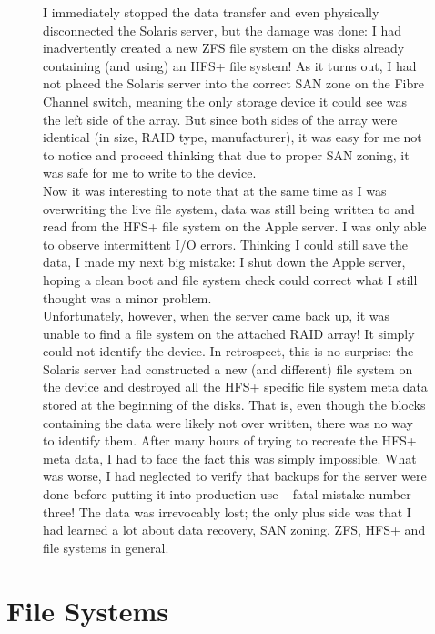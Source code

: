 \begin{figure}
\begin{experience}
\ContinuedFloat
I immediately stopped the data transfer and even
physically disconnected the Solaris server, but the
damage was done: I had inadvertently created a new ZFS
file system on the disks already containing (and
using) an HFS+ file system!  As it turns out, I had
not placed the Solaris server into the correct SAN
zone on the Fibre Channel switch, meaning the only
storage device it could see was the left side of the
array.  But since both sides of the array were
identical (in size, RAID type, manufacturer), it was
easy for me not to notice and proceed thinking that
due to proper SAN zoning, it was safe for me to write
to the device. \\ [10pt]

Now it was interesting to note that at the same time
as I was overwriting the live file system, data was
still being written to and read from the HFS+ file
system on the Apple server.  I was only able to
observe intermittent I/O errors.  Thinking I could
still save the data, I made my next big mistake: I
shut down the Apple server, hoping a clean boot and
file system check could correct what I still thought
was a minor problem.  \\ [10pt]

Unfortunately, however, when the server came back up,
it was unable to find a file system on the attached
RAID array!  It simply could not identify the device.
In retrospect, this is no surprise: the Solaris server
had constructed a new (and different) file system on
the device and destroyed all the HFS+ specific file
system meta data stored at the beginning of the disks.
That is, even though the blocks containing the data
were likely not over written, there was no way to
identify them.  After many hours of trying to recreate
the HFS+ meta data, I had to face the fact this was
simply impossible.  What was worse, I had neglected to
verify that backups for the server were done before
putting it into production use -- fatal mistake number
three!  The data was irrevocably lost; the only plus
side was that I had learned a lot about data recovery,
SAN zoning, ZFS, HFS+ and file systems in general.

\end{experience}
\end{figure}

\section{File Systems}
\label{sec:file systems}

